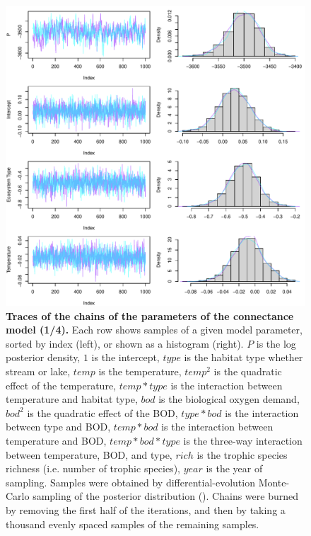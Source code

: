 \documentclass[11pt, oneside]{article}
\begin{document}
\begin{figure}[H]
\begin{center}
\includegraphics[page=1, width=1\linewidth]{scripts/b0_6_4/out_con/fig_tracePlot_beta.pdf}
\caption{
    \textbf{Traces of the chains of the parameters of the connectance model (1/4).}
    Each row shows samples of a given model parameter, sorted by index (left), or shown as a histogram (right).
    $P$ is the log posterior density, $1$ is the intercept, $type$ is the habitat type whether stream or lake, $temp$ is the temperature, $temp^2$ is the quadratic effect of the temperature, $temp * type$ is the interaction between temperature and habitat type, $bod$ is the biological oxygen demand, $bod^2$ is the quadratic effect of the BOD, $type * bod$ is the interaction between type and BOD, $temp * bod$ is the interaction between temperature and BOD, $temp * bod * type$ is the three-way interaction between temperature, BOD, and type, $rich$ is the trophic species richness (i.e. number of trophic species), $year$ is the year of sampling.
    Samples were obtained by differential-evolution Monte-Carlo sampling of the posterior distribution (\cite{TerBraak2006}).
    Chains were burned by removing the first half of the iterations, and then by taking a thousand evenly spaced samples of the remaining samples.
} 
\end{center}
\end{figure}
\end{document}
